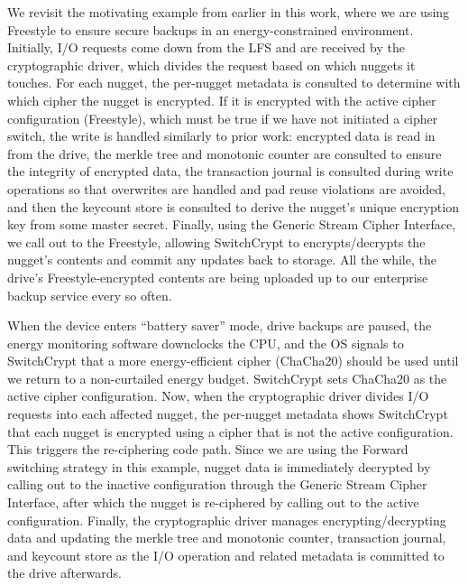We revisit the motivating example from earlier in this work, where we
are using Freestyle to ensure secure backups in an energy-constrained
environment.  Initially, I/O requests come down from the LFS and are
received by the cryptographic driver, which divides the request based
on which nuggets it touches. For each nugget, the per-nugget metadata
is consulted to determine with which cipher the nugget is encrypted.
If it is encrypted with the active cipher configuration (Freestyle),
which must be true if we have not initiated a cipher switch, the write
is handled similarly to prior work: encrypted data is read in from the
drive, the merkle tree and monotonic counter are consulted to ensure
the integrity of encrypted data, the transaction journal is consulted
during write operations so that overwrites are handled and pad reuse
violations are avoided, and then the keycount store is consulted to
derive the nugget's unique encryption key from some master secret.
Finally, using the Generic Stream Cipher Interface, we call out to the
Freestyle, allowing SwitchCrypt to encrypts/decrypts the nugget's
contents and commit any updates back to storage.  All the while, the
drive's Freestyle-encrypted contents are being uploaded up to our
enterprise backup service every so often. 

When the device enters ``battery saver'' mode, drive backups are paused, the
energy monitoring software downclocks the CPU, and the OS signals to SwitchCrypt
that a more energy-efficient cipher (ChaCha20) should be used until we return to
a non-curtailed energy budget. SwitchCrypt sets ChaCha20 as the active cipher
configuration. Now, when the cryptographic driver divides I/O requests into each
affected nugget, the per-nugget metadata shows SwitchCrypt that each nugget is
encrypted using a cipher that is not the active configuration. This triggers the
re-ciphering code path. Since we are using the Forward switching strategy in
this example, nugget data is immediately decrypted by calling out to the
inactive configuration through the Generic Stream Cipher Interface, after which
the nugget is re-ciphered by calling out to the active configuration. Finally,
the cryptographic driver manages encrypting/decrypting data and updating the
merkle tree and monotonic counter, transaction journal, and keycount store as
the I/O operation and related metadata is committed to the drive afterwards.

